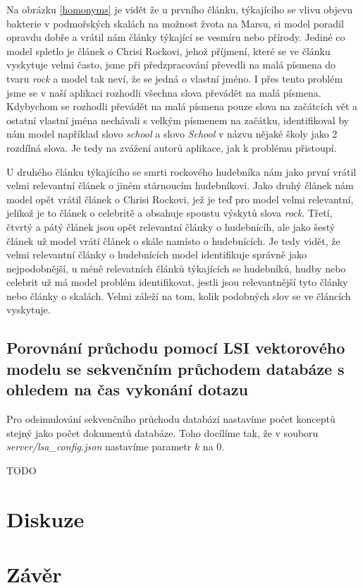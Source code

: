 \documentclass[11pt]{scrartcl} %
\begin{document}
Na obrázku \ref{homonyms} je vidět že u prvního článku, týkajícího se vlivu objevu bakterie v podmořských skalách na možnost žvota na Marsu, si model poradil opravdu dobře a vrátil nám články týkající se vesmíru nebo přírody. Jediné co model spletlo je článek o Chrisi Rockovi, jehož příjmení, které se ve článku vyskytuje velmi často, jsme při předzpracování převedli na malá písmena do tvaru \emph{rock} a model tak neví, že se jedná o vlastní jméno. I přes tento problém jsme se v naší aplikaci rozhodli všechna slova převádět na malá písmena. Kdybychom se rozhodli převádět na malá písmena pouze slova na začátcích vět a ostatní vlastní jména nechávali s velkým písmenem na začátku, identifikoval by nám model například slovo \emph{school} a slovo \emph{School} v názvu nějaké školy jako 2 rozdílná slova. Je tedy na zvážení autorů aplikace, jak k problému přistoupí.

\bigskip

U druhého článku týkajícího se smrti rockového hudebníka nám jako první vrátil velmi relevantní článek o jiném stárnoucím hudebníkovi. Jako druhý článek nám model opět vrátil článek o Chrisi Rockovi, jež je teď pro model velmi relevantní, jelikož je to článek o celebritě a obsahuje spoustu výskytů slova \emph{rock}. Třetí, čtvrtý a pátý článek jsou opět relevantní články o hudebnícíh, ale jako šestý článek už model vrátí článek o skále namísto o hudebnících. Je tedy vidět, že velmi relevantní články o hudebnících model identifikuje správně jako nejpodobnější, u méně relevatních článků týkajících se hudebníků, hudby nebo celebrit už má model problém identifikovat, jestli jsou relevantnější tyto články nebo články o skalách. Velmi záleží na tom, kolik podobných slov se ve článcích vyskytuje.

\subsection{Porovnání průchodu pomocí LSI vektorového modelu se sekvenčním průchodem databáze s ohledem na čas vykonání dotazu}

Pro odsimulování sekvenčního průchodu databází nastavíme počet konceptů stejný jako počet dokumentů databáze. Toho docílíme tak, že v souboru \emph{server/lsa\_config.json} nastavíme parametr $k$ na 0.

TODO

\section{Diskuze}


\section{Závěr}
\end{document}
